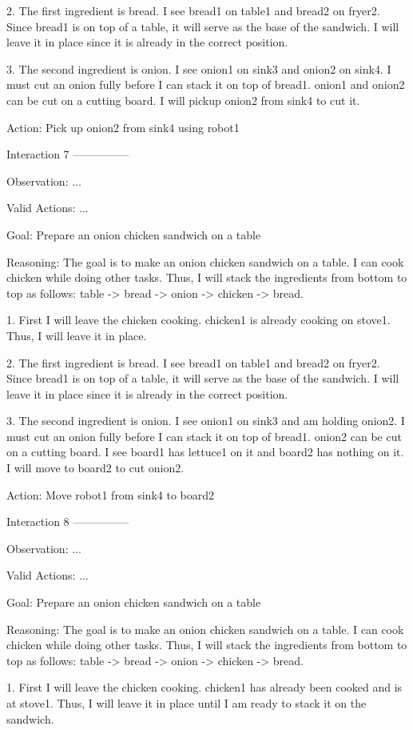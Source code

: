 2. The first ingredient is bread. I see bread1 on table1 and bread2 on fryer2. Since bread1 is on top of a table, it will serve as the base of the sandwich. I will leave it in place since it is already in the correct position.

3. The second ingredient is onion. I see onion1 on sink3 and onion2 on sink4. I must cut an onion fully before I can stack it on top of bread1. onion1 and onion2 can be cut on a cutting board. I will pickup onion2 from sink4 to cut it.

Action: Pick up onion2 from sink4 using robot1


Interaction 7
---------------


Observation: ...

Valid Actions: ...

Goal: Prepare an onion chicken sandwich on a table


Reasoning: The goal is to make an onion chicken sandwich on a table. I can cook chicken while doing other tasks. Thus, I
will stack the ingredients from bottom to top as follows: table -> bread -> onion -> chicken -> bread.

1. First I will leave the chicken cooking. chicken1 is already cooking on stove1. Thus, I will leave it in place.

2. The first ingredient is bread. I see bread1 on table1 and bread2 on fryer2. Since bread1 is on top of a table, it will serve as the base of the sandwich. I will leave it in place since it is already in the correct position.

3. The second ingredient is onion. I see onion1 on sink3 and am holding onion2. I must cut an onion fully before I can stack it on top of bread1. onion2 can be cut on a cutting board. I see board1 has lettuce1 on it and board2 has nothing on it. I will move to board2 to cut onion2.

Action: Move robot1 from sink4 to board2


Interaction 8
---------------


Observation: ...

Valid Actions: ...

Goal: Prepare an onion chicken sandwich on a table


Reasoning: The goal is to make an onion chicken sandwich on a table. I can cook chicken while doing other tasks. Thus, I
will stack the ingredients from bottom to top as follows: table -> bread -> onion -> chicken -> bread.

1. First I will leave the chicken cooking. chicken1 has already been cooked and is at stove1. Thus, I will leave it in place until I am ready to stack it on the sandwich.

